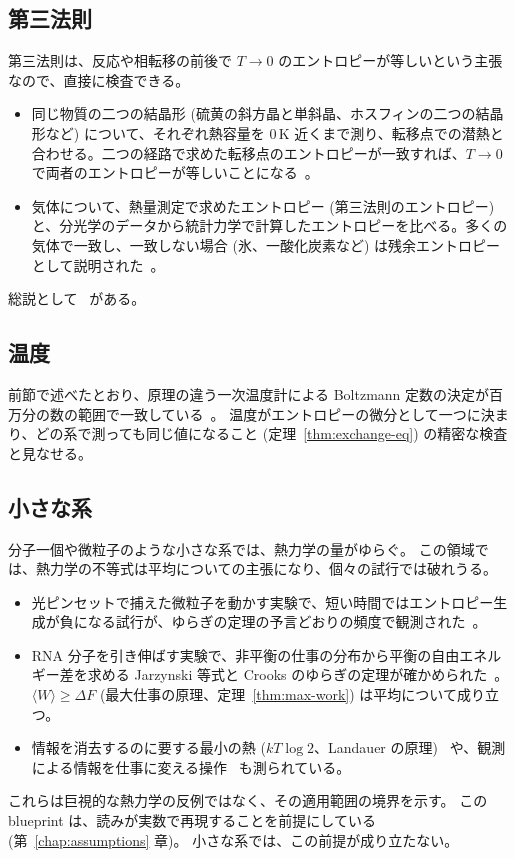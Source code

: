 \subsection{第三法則}

第三法則は、反応や相転移の前後で $T \to 0$ のエントロピーが等しいという主張なので、直接に検査できる。
\begin{itemize}
  \item 同じ物質の二つの結晶形 (硫黄の斜方晶と単斜晶、ホスフィンの二つの結晶形など) について、それぞれ熱容量を $0\,\mathrm{K}$ 近くまで測り、転移点での潜熱と合わせる。二つの経路で求めた転移点のエントロピーが一致すれば、$T \to 0$ で両者のエントロピーが等しいことになる~\cite{EastmanMcGavock1937, StephensonGiauque1937}。
  \item 気体について、熱量測定で求めたエントロピー (第三法則のエントロピー) と、分光学のデータから統計力学で計算したエントロピーを比べる。多くの気体で一致し、一致しない場合 (氷、一酸化炭素など) は残余エントロピーとして説明された~\cite{GiauqueWiebe1928, GiauqueJohnston1929, GiauqueStout1936}。
\end{itemize}
総説として~\cite{Wilks1961} がある。

\subsection{温度}

前節で述べたとおり、原理の違う一次温度計による Boltzmann 定数の決定が百万分の数の範囲で一致している~\cite{Fischer2018}。
温度がエントロピーの微分として一つに決まり、どの系で測っても同じ値になること (定理~\ref{thm:exchange-eq}) の精密な検査と見なせる。

\subsection{小さな系}

分子一個や微粒子のような小さな系では、熱力学の量がゆらぐ。
この領域では、熱力学の不等式は平均についての主張になり、個々の試行では破れうる。
\begin{itemize}
  \item 光ピンセットで捕えた微粒子を動かす実験で、短い時間ではエントロピー生成が負になる試行が、ゆらぎの定理の予言どおりの頻度で観測された~\cite{Wang2002}。
  \item RNA 分子を引き伸ばす実験で、非平衡の仕事の分布から平衡の自由エネルギー差を求める Jarzynski 等式と Crooks のゆらぎの定理が確かめられた~\cite{Liphardt2002, Collin2005}。$\langle W \rangle \ge \Delta F$ (最大仕事の原理、定理~\ref{thm:max-work}) は平均について成り立つ。
  \item 情報を消去するのに要する最小の熱 ($kT \log 2$、Landauer の原理)~\cite{Berut2012} や、観測による情報を仕事に変える操作~\cite{Toyabe2010} も測られている。
\end{itemize}
これらは巨視的な熱力学の反例ではなく、その適用範囲の境界を示す。
この blueprint は、読みが実数で再現することを前提にしている (第~\ref{chap:assumptions} 章)。
小さな系では、この前提が成り立たない。

